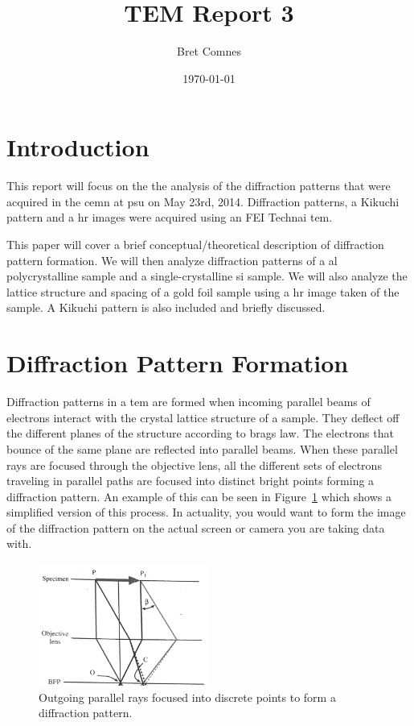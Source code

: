 \documentclass[12pt,a4paper]{article}
\title{TEM Report 3}
\author{Bret Comnes}
\date{\today}
\begin{document}
\maketitle

\section{Introduction} %

This report will focus on the the analysis of the diffraction patterns that were acquired in the \ac{cemn} at \ac{psu} on May 23rd, 2014.  Diffraction patterns, a Kikuchi pattern and a \ac{hr} images were acquired using an FEI Technai \ac{tem}.

This paper will cover a brief conceptual/theoretical description of diffraction pattern formation.  We will then analyze diffraction patterns of a \ac{al} polycrystalline sample and a single-crystalline \ac{si} sample.  We will also analyze the lattice structure and spacing of a gold foil sample using a \ac{hr} image taken of the sample.  A Kikuchi pattern is also included and briefly discussed.

\section{Diffraction Pattern Formation} %
\label{sec:diffraction_pattern_formation}

Diffraction patterns in a \ac{tem} are formed when incoming parallel beams of electrons interact with the crystal lattice structure of a sample.  They deflect off the different planes of the structure according to brags law.  The electrons that bounce of the same plane are reflected into parallel beams.  When these parallel rays are focused through the objective lens, all the different sets of electrons traveling in parallel paths are focused into distinct bright points forming a diffraction pattern.  An example of this can be seen in Figure~\ref{fig:diff_example} which shows a simplified version of this process.  In actuality, you would want to form the image of the diffraction pattern on the actual screen or camera you are taking data with.

\begin{figure}[htbp]
  \centering
  \includegraphics[width=0.5\textwidth]{data/diffpattern.PNG}
  \caption{Outgoing parallel rays focused into discrete points to form a diffraction pattern.\cite{tem}}
  \label{fig:diff_example}
\end{figure}
\end{document}
